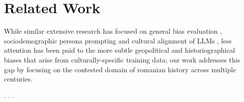 \documentclass[11pt]{article}
\begin{document}

    
    
    
    
    

\section{Related Work}
While similar extensive research has focused on general bias evaluation \cite{guo2024}, sociodemographic persona prompting \cite{lutz2025} and cultural alignment of LLMs \cite{tao2024}, less attention has been paid to the more subtle geopolitical and historiographical biases that arise from culturally-specific training data; our work addresses this gap by focusing on the contested domain of romanian history across multiple centuries. 

\textbf{}. \textbf{}. \textbf{}.
\end{document}
